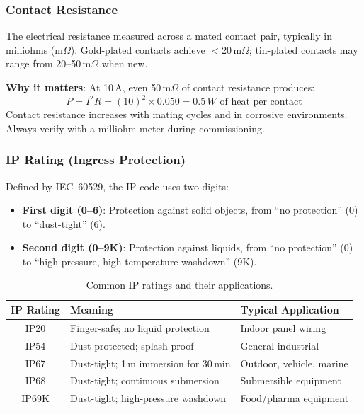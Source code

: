 \subsubsection{Contact Resistance}

The electrical resistance measured across a mated contact pair, typically in milliohms (m$\Omega$). Gold-plated contacts achieve $<$20\,m$\Omega$; tin-plated contacts may range from 20--50\,m$\Omega$ when new.

\textbf{Why it matters}: At 10\,A, even 50\,m$\Omega$ of contact resistance produces:
\begin{equation}
  P = I^2 R = (10)^2 \times 0.050 = 0.5\,W \text{ of heat per contact}
\end{equation}
Contact resistance increases with mating cycles and in corrosive environments. Always verify with a milliohm meter during commissioning.

\subsubsection{IP Rating (Ingress Protection)}

Defined by IEC~60529, the IP code uses two digits:
\begin{itemize}[nosep,leftmargin=1.5em]
  \item \textbf{First digit (0--6)}: Protection against solid objects, from ``no protection'' (0) to ``dust-tight'' (6).
  \item \textbf{Second digit (0--9K)}: Protection against liquids, from ``no protection'' (0) to ``high-pressure, high-temperature washdown'' (9K).
\end{itemize}

\begin{table}[htbp]
\centering
\small
\begin{tabular}{c l l}
  \toprule
  \textbf{IP Rating} & \textbf{Meaning} & \textbf{Typical Application} \\
  \midrule
  IP20 & Finger-safe; no liquid protection & Indoor panel wiring \\
  IP54 & Dust-protected; splash-proof & General industrial \\
  IP67 & Dust-tight; 1\,m immersion for 30\,min & Outdoor, vehicle, marine \\
  IP68 & Dust-tight; continuous submersion & Submersible equipment \\
  IP69K & Dust-tight; high-pressure washdown & Food/pharma equipment \\
  \bottomrule
\end{tabular}
\caption{Common IP ratings and their applications.}
\end{table}

